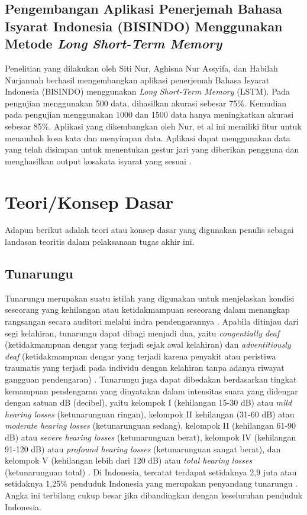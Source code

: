\subsection{Pengembangan Aplikasi Penerjemah Bahasa Isyarat Indonesia (BISINDO) Menggunakan Metode \textit{Long Short-Term Memory}}
Penelitian yang dilakukan oleh Siti Nur, Aghisna Nur Assyifa, dan Habilah Nurjannah berhasil mengembangkan aplikasi penerjemah Bahasa Isyarat Indonesia (BISINDO) menggunakan \emph{Long Short-Term Memory} (LSTM). Pada pengujian menggunakan 500 data, dihasilkan akurasi sebesar 75\%. Kemudian pada pengujian menggunakan 1000 dan 1500 data hanya meningkatkan akurasi sebesar 85\%. Aplikasi yang dikembangkan oleh Nur, et al ini memiliki fitur untuk menambah kosa kata dan menyimpan data. Aplikasi dapat menggunakan data yang telah disimpan untuk menentukan gestur jari yang diberikan pengguna dan menghasilkan output kosakata isyarat yang sesuai \parencite{nur2023}.

\newpage

\section{Teori/Konsep Dasar}
Adapun berikut adalah teori atau konsep dasar yang digunakan penulis sebagai landasan teoritis dalam pelaksanaan tugas akhir ini.

\subsection{Tunarungu} 

Tunarungu merupakan suatu istilah yang digunakan untuk menjelaskan kondisi seseorang yang kehilangan atau ketidakmampuan seseorang dalam menangkap rangsangan secara auditori melalui indra pendengarannya \parencite{somantri2006}. Apabila ditinjau dari segi kelahiran, tunarungu dapat dibagi menjadi dua, yaitu \emph{congentially deaf} (ketidakmampuan dengar yang terjadi sejak awal kelahiran) dan \emph{adventitiously deaf} (ketidakmampuan dengar yang terjadi karena penyakit atau peristiwa traumatis yang terjadi pada individu dengan kelahiran tanpa adanya riwayat gangguan pendengaran) \parencite{hallahan2009}. Tunarungu juga dapat dibedakan berdasarkan tingkat kemampuan pendengaran yang dinyatakan dalam intensitas suara yang didengar dengan satuan dB (decibel), yaitu kelompok I (kehilangan 15-30 dB) atau \emph{mild hearing losses} (ketunarunguan ringan), kelompok II kehilangan (31-60 dB) atau \emph{moderate hearing losses} (ketunarunguan sedang), kelompok II (kehilangan 61-90 dB) atau \emph{severe hearing losses} (ketunarunguan berat), kelompok IV (kehilangan 91-120 dB) atau \emph{profound hearing losses} (ketunarunguan sangat berat), dan kelompok V (kehilangan lebih dari 120 dB) atau \emph{total hearing losses} (ketunarunguan total) \parencite{winarsih2007}. Di Indonesia, tercatat terdapat setidaknya 2,9 juta atau setidaknya 1,25\% penduduk Indonesia yang merupakan penyandang tunarungu \parencite{evitasari2015}. Angka ini terbilang cukup besar jika dibandingkan dengan keseluruhan penduduk Indonesia.

